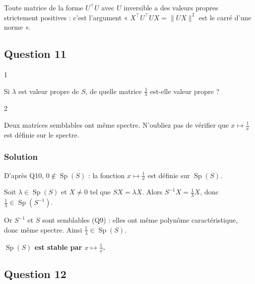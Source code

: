 \documentclass[11pt,a4paper]{article}
\begin{document}
\begin{methode}

Toute matrice de la forme \(U^\top U\) avec \(U\) inversible a des valeurs propres strictement positives : c'est l'argument « \(X^\top U^\top UX=\|UX\|^2\) est le carré d'une norme ».

\end{methode}

\hypertarget{question-11}{%
\subsection{Question 11}\label{question-11}}

\begin{indication}{1}

Si \(\lambda\) est valeur propre de \(S\), de quelle matrice \(\frac1\lambda\) est-elle valeur propre ?

\end{indication}

\begin{indication}{2}

Deux matrices semblables ont même spectre. N'oubliez pas de vérifier que \(x\mapsto\frac1x\) est définie sur le spectre.

\end{indication}

\hypertarget{solution-10}{%
\subsubsection{Solution}\label{solution-10}}

D'après Q10, \(0\notin\operatorname{Sp}(S)\) : la fonction \(x\mapsto\frac1x\) est définie sur \(\operatorname{Sp}(S)\).

Soit \(\lambda\in\operatorname{Sp}(S)\) et \(X\neq0\) tel que \(SX=\lambda X\). Alors \(S^{-1}X=\frac1\lambda X\), donc \(\frac1\lambda\in\operatorname{Sp}(S^{-1})\).

Or \(S^{-1}\) et \(S\) sont semblables (Q9) : elles ont même polynôme caractéristique, donc même spectre. Ainsi \(\frac1\lambda\in\operatorname{Sp}(S)\).

\textbf{\(\operatorname{Sp}(S)\) est stable par \(x\mapsto\frac1x\).}

\hypertarget{question-12}{%
\subsection{Question 12}\label{question-12}}
\end{document}
